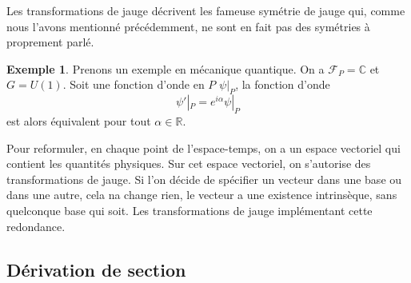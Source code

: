 \documentclass[a4paper,11pt]{report}
\theoremstyle{definition}
\theoremstyle{plain}
\theoremstyle{definition}
\newtheorem{exmp}{Exemple}[chapter]
\theoremstyle{remark}
\newcommand{\F}{\mathcal{F}}
\begin{document}
                Les transformations de jauge décrivent les fameuse symétrie de jauge qui, comme nous l'avons mentionné précédemment, ne sont en fait pas des symétries à proprement parlé.
                
                \begin{exmp}
                    Prenons un exemple en mécanique quantique. On a $\F_P = \mathbb{C}$ et $G = U(1)$. Soit une fonction d'onde en $P$ $\psi|_P$, la fonction d'onde
                    \begin{equation}
                        \psi'|_P = e^{i\alpha}\psi|_P
                    \end{equation}
                    est alors équivalent pour tout $\alpha\in\mathbb{R}$.
                \end{exmp}
                
                Pour reformuler, en chaque point de l'espace-temps, on a un espace vectoriel qui contient les quantités physiques. Sur cet espace vectoriel, on s'autorise des transformations de jauge. Si l'on décide de spécifier un vecteur dans une base ou dans une autre, cela na change rien, le vecteur a une existence intrinsèque, sans quelconque base qui soit. Les transformations de jauge implémentant cette redondance.
            
            \subsection{Dérivation de section}
            
\end{document}
